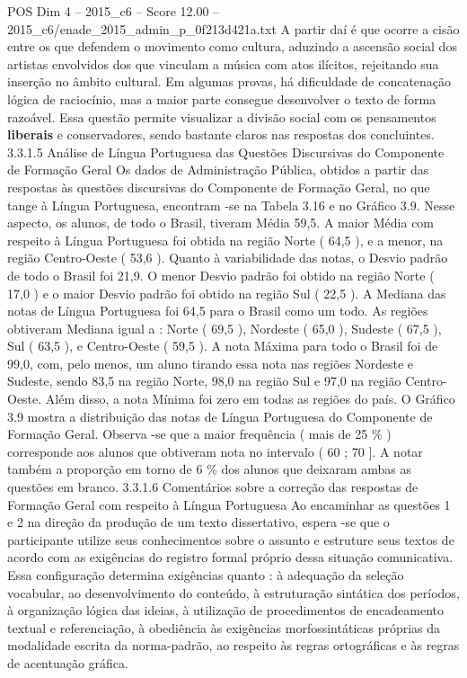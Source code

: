 \begin{textsample}{POS Dim 4 – 2015\_c6 – Score 12.00 – 2015\_c6/enade\_2015\_admin\_p\_0f213d421a.txt}
A partir daí é que ocorre a cisão entre os que defendem o movimento como cultura, aduzindo a ascensão social dos artistas envolvidos dos que vinculam a música com atos ilícitos, rejeitando sua inserção no âmbito cultural.
Em algumas provas, há dificuldade de concatenação lógica de raciocínio, mas a maior parte consegue desenvolver o texto de forma razoável.
Essa questão permite visualizar a divisão social com os pensamentos \textbf{liberais} e conservadores, sendo bastante claros nas respostas dos concluintes. 3.3.1.5 Análise de Língua Portuguesa das Questões Discursivas do Componente de Formação Geral Os dados de Administração Pública, obtidos a partir das respostas às questões discursivas do Componente de Formação Geral, no que tange à Língua Portuguesa, encontram -se na Tabela 3.16 e no Gráfico 3.9.
Nesse aspecto, os alunos, de todo o Brasil, tiveram Média 59,5.
A maior Média com respeito à Língua Portuguesa foi obtida na região Norte ( 64,5 ), e a menor, na região Centro-Oeste ( 53,6 ).
Quanto à variabilidade das notas, o Desvio padrão de todo o Brasil foi 21,9.
O menor Desvio padrão foi obtido na região Norte ( 17,0 ) e o maior Desvio padrão foi obtido na região Sul ( 22,5 ).
A Mediana das notas de Língua Portuguesa foi 64,5 para o Brasil como um todo.
As regiões obtiveram Mediana igual a : Norte ( 69,5 ), Nordeste ( 65,0 ), Sudeste ( 67,5 ), Sul ( 63,5 ), e Centro-Oeste ( 59,5 ).
A nota Máxima para todo o Brasil foi de 99,0, com, pelo menos, um aluno tirando essa nota nas regiões Nordeste e Sudeste, sendo 83,5 na região Norte, 98,0 na região Sul e 97,0 na região Centro-Oeste.
Além disso, a nota Mínima foi zero em todas as regiões do país.
O Gráfico 3.9 mostra a distribuição das notas de Língua Portuguesa do Componente de Formação Geral.
Observa -se que a maior frequência ( mais de 25 \% ) corresponde aos alunos que obtiveram nota no intervalo ( 60 ; 70 ].
A notar também a proporção em torno de 6 \% dos alunos que deixaram ambas as questões em branco. 3.3.1.6 Comentários sobre a correção das respostas de Formação Geral com respeito à Língua Portuguesa Ao encaminhar as questões 1 e 2 na direção da produção de um texto dissertativo, espera -se que o participante utilize seus conhecimentos sobre o assunto e estruture seus textos de acordo com as exigências do registro formal próprio dessa situação comunicativa.
Essa configuração determina exigências quanto : à adequação da seleção vocabular, ao desenvolvimento do conteúdo, à estruturação sintática dos períodos, à organização lógica das ideias, à utilização de procedimentos de encadeamento textual e referenciação, à obediência às exigências morfossintáticas próprias da modalidade escrita da norma-padrão, ao respeito às regras ortográficas e às regras de acentuação gráfica.

\end{textsample}
